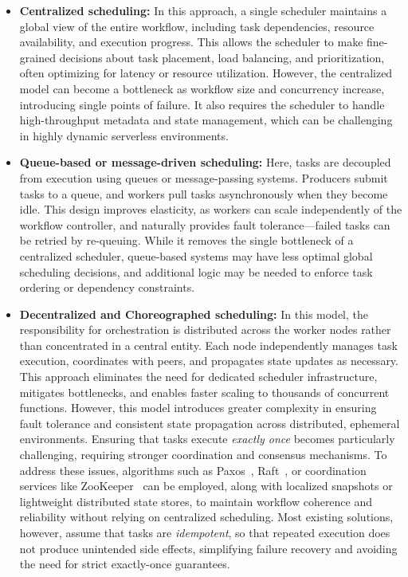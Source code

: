 \begin{itemize}
\item \textbf{Centralized scheduling:} In this approach, a single scheduler maintains a global view of the entire workflow, including task dependencies, resource availability, and execution progress. This allows the scheduler to make fine-grained decisions about task placement, load balancing, and prioritization, often optimizing for latency or resource utilization. However, the centralized model can become a bottleneck as workflow size and concurrency increase, introducing single points of failure. It also requires the scheduler to handle high-throughput metadata and state management, which can be challenging in highly dynamic serverless environments.

\item \textbf{Queue-based or message-driven scheduling:} Here, tasks are decoupled from execution using queues or message-passing systems. Producers submit tasks to a queue, and workers pull tasks asynchronously when they become idle. This design improves elasticity, as workers can scale independently of the workflow controller, and naturally provides fault tolerance—failed tasks can be retried by re-queuing. While it removes the single bottleneck of a centralized scheduler, queue-based systems may have less optimal global scheduling decisions, and additional logic may be needed to enforce task ordering or dependency constraints.

\item \textbf{Decentralized and Choreographed scheduling:} In this model, the responsibility for orchestration is distributed across the worker nodes rather than concentrated in a central entity. Each node independently manages task execution, coordinates with peers, and propagates state updates as necessary. This approach eliminates the need for dedicated scheduler infrastructure, mitigates bottlenecks, and enables faster scaling to thousands of concurrent functions. However, this model introduces greater complexity in ensuring fault tolerance and consistent state propagation across distributed, ephemeral environments. Ensuring that tasks execute \textit{exactly once} becomes particularly challenging, requiring stronger coordination and consensus mechanisms. To address these issues, algorithms such as Paxos~\cite{paxos}, Raft~\cite{raft}, or coordination services like ZooKeeper~\cite{zookeeper} can be employed, along with localized snapshots or lightweight distributed state stores, to maintain workflow coherence and reliability without relying on centralized scheduling. Most existing solutions, however, assume that tasks are \textit{idempotent}, so that repeated execution does not produce unintended side effects, simplifying failure recovery and avoiding the need for strict exactly-once guarantees.


\end{itemize}
